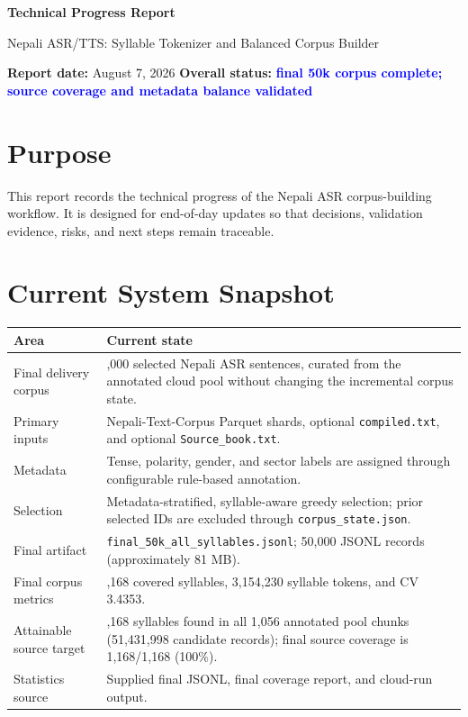 \documentclass[11pt,a4paper]{article}
\newcommand{\project}{Nepali ASR/TTS: Syllable Tokenizer and Balanced Corpus Builder}
\newcommand{\status}[1]{\textcolor{blue}{\textbf{#1}}}
\begin{document}
\begin{center}
{\LARGE\bfseries Technical Progress Report\par}
\vspace{0.35em}
{\large \project\par}
\vspace{0.5em}
\textbf{Report date:} August 7, 2026 \qquad
\textbf{Overall status:} \status{final 50k corpus complete; source coverage and metadata balance validated}
\end{center}
\section{Purpose}
This report records the technical progress of the Nepali ASR corpus-building workflow.
It is designed for end-of-day updates so that decisions, validation evidence, risks, and next steps remain traceable.
\section{Current System Snapshot}
\begin{longtable}{>{\raggedright\arraybackslash}p{}>{\raggedright\arraybackslash}p{}}
\toprule
\textbf{Area} & \textbf{Current state} \\
\midrule
Final delivery corpus & 50,000 selected Nepali ASR sentences, curated from the annotated cloud pool without changing the incremental corpus state. \\
Primary inputs & Nepali-Text-Corpus Parquet shards, optional \texttt{compiled.txt}, and optional \texttt{Source\_book.txt}. \\
Metadata & Tense, polarity, gender, and sector labels are assigned through configurable rule-based annotation. \\
Selection & Metadata-stratified, syllable-aware greedy selection; prior selected IDs are excluded through \texttt{corpus\_state.json}. \\
Final artifact & \texttt{final\_50k\_all\_syllables.jsonl}; 50,000 JSONL records (approximately 81 MB). \\
Final corpus metrics & 1,168 covered syllables, 3,154,230 syllable tokens, and CV 3.4353. \\
Attainable source target & 1,168 syllables found in all 1,056 annotated pool chunks (51,431,998 candidate records); final source coverage is 1,168/1,168 (100\%). \\
Statistics source & Supplied final JSONL, final coverage report, and cloud-run output. \\
\bottomrule
\end{longtable}
\end{document}
